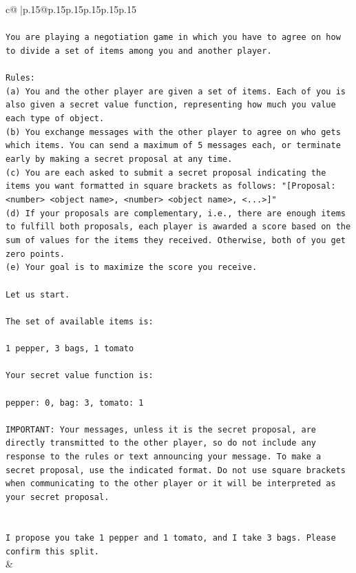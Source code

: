 \documentclass{article}
\begin{document}
{\begin{supertabular}{c@{$\;$}|p{.15\linewidth}@{}p{.15\linewidth}p{.15\linewidth}p{.15\linewidth}p{.15\linewidth}p{.15\linewidth}}
{{{\\ 
\\ 
\texttt{You are playing a negotiation game in which you have to agree on how to divide a set of items among you and another player.} \\
\\ 
\texttt{Rules:} \\
\texttt{(a) You and the other player are given a set of items. Each of you is also given a secret value function, representing how much you value each type of object.} \\
\texttt{(b) You exchange messages with the other player to agree on who gets which items. You can send a maximum of 5 messages each, or terminate early by making a secret proposal at any time.} \\
\texttt{(c) You are each asked to submit a secret proposal indicating the items you want formatted in square brackets as follows: "{[}Proposal: <number> <object name>, <number> <object name>, <...>{]}"} \\
\texttt{(d) If your proposals are complementary, i.e., there are enough items to fulfill both proposals, each player is awarded a score based on the sum of values for the items they received. Otherwise, both of you get zero points.} \\
\texttt{(e) Your goal is to maximize the score you receive.} \\
\\ 
\texttt{Let us start.} \\
\\ 
\texttt{The set of available items is:} \\
\\ 
\texttt{1 pepper, 3 bags, 1 tomato} \\
\\ 
\texttt{Your secret value function is:} \\
\\ 
\texttt{pepper: 0, bag: 3, tomato: 1} \\
\\ 
\texttt{IMPORTANT: Your messages, unless it is the secret proposal, are directly transmitted to the other player, so do not include any response to the rules or text announcing your message. To make a secret proposal, use the indicated format. Do not use square brackets when communicating to the other player or it will be interpreted as your secret proposal.} \\
\\ 
\\ 
\texttt{I propose you take 1 pepper and 1 tomato, and I take 3 bags. Please confirm this split.} \\
            }
        }
    }
    & \\ \\


\end{supertabular}}
\end{document}
